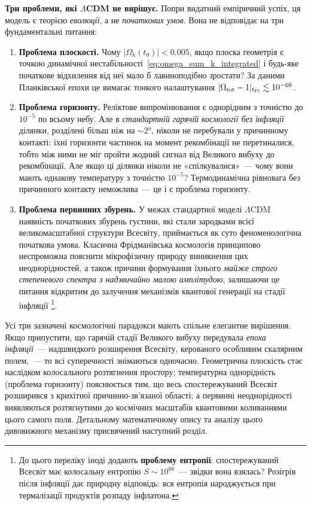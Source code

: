 \medskip
\textbf{Три проблеми, які $\Lambda$CDM не вирішує.}
Попри видатний емпіричний успіх, ця модель є теорією \emph{еволюції},
а не \emph{початкових умов}.
Вона не відповідає на три фундаментальні питання:

\begin{enumerate}
  \item \textbf{Проблема плоскості.}
  Чому $|\Omega_k(t_0)| < 0.005$, якщо плоска геометрія є точкою
  динамічної нестабільності~\eqref{eq:omega_sum_k_integrated} і будь-яке
  початкове відхилення від неї мало б лавиноподібно зростати?
  За даними Планківської епохи це вимагає тонкого налаштування
  $|\Omega_{\rm tot} - 1|_{t_{\rm Pl}} \lesssim 10^{-60}$.

  \item \textbf{Проблема горизонту.}
  Реліктове випромінювання є однорідним з точністю до $10^{-5}$ по всьому
  небу. Але в \emph{стандартній гарячій космології без інфляції} ділянки,
  розділені більш ніж на ${\sim}2°$, ніколи не перебували у причинному
  контакті: їхні горизонти частинок на момент рекомбінації
  не перетиналися, тобто між ними не міг пройти жодний сигнал від Великого
  вибуху до рекомбінації. Але якщо ці ділянки ніколи не «спілкувалися»~---
  чому вони мають однакову температуру з точністю $10^{-5}$?
  Термодинамічна рівновага без причинного контакту неможлива~---
  це і є проблема горизонту.

  \item \textbf{Проблема первинних збурень.}
        У межах стандартної моделі $\Lambda$CDM наявність початкових збурень
        густини, які стали зародками всієї великомасштабної структури Всесвіту,
        приймається як суто феноменологічна початкова умова. Класична Фрідманівська
        космологія принципово неспроможна пояснити мікрофізичну природу виникнення
        цих неоднорідностей, а також причини формування їхнього \emph{майже строго
        степеневого спектра з надзвичайно малою амплітудою}, залишаючи це питання
        відкритим до залучення механізмів квантової генерації на стадії інфляції%
        \footnote{До цього переліку іноді додають \textbf{проблему ентропії}:
        спостережуваний Всесвіт має колосальну ентропію $S \sim 10^{88}$~---
        звідки вона взялась? Розігрів після інфляції дає природну відповідь:
        вся ентропія народжується при термалізації продуктів розпаду інфлатона.}.
\end{enumerate}

\medskip
Усі три зазначені космологічні парадокси мають спільне елегантне вирішення. Якщо припустити, що гарячій стадії Великого вибуху передувала \emph{епоха інфляції}~--- надшвидкого розширення Всесвіту, керованого особливим скалярним полем,~--- то всі суперечності знімаються одночасно. Геометрична плоскість стає наслідком колосального розтягнення простору; температурна однорідність (проблема горизонту) пояснюється тим, що весь спостережуваний Всесвіт розширився з крихітної причинно-зв'язаної області; а первинні неоднорідності виявляються розтягнутими до космічних масштабів квантовими коливаннями цього самого поля. Детальному математичному опису та аналізу цього дивовижного механізму присвячений наступний розділ.

